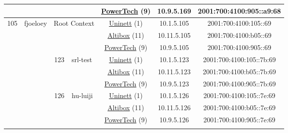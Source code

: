 \begin{small}
\begin{center}
\begin{longtable}{|c|c|c|c|c|c|c|c|}
  &  &  &  & \multicolumn{2}{|c|}{\tiny{\href{http://www.powertech.no}{PowerTech} (9)}} & \tiny{10.9.5.169} & \tiny{2001:700:4100:905::a9:68} \\ \hline
 \multirow{27}{*}{\tiny{105}} & \multicolumn{1}{|l|}{\multirow{27}{*}{\tiny{fjoeloey}}} & \multicolumn{2}{|c|}{\multirow{3}{*}{\tiny{Root Context}}} & \multicolumn{2}{|c|}{\tiny{\href{https://www.uninett.no}{Uninett} (1)}} & \tiny{10.1.5.105} & \tiny{2001:700:4100:105::69} \\* \cline{5-5}\cline{6-6}\cline{7-7}\cline{8-8}
  &  & \multicolumn{2}{|c|}{} & \multicolumn{2}{|c|}{\tiny{\href{https://www.altibox.no}{Altibox} (11)}} & \tiny{10.11.5.105} & \tiny{2001:700:4100:b05::69} \\* \cline{5-5}\cline{6-6}\cline{7-7}\cline{8-8}
  &  & \multicolumn{2}{|c|}{} & \multicolumn{2}{|c|}{\tiny{\href{http://www.powertech.no}{PowerTech} (9)}} & \tiny{10.9.5.105} & \tiny{2001:700:4100:905::69} \\* \cline{3-3}\cline{4-4}\cline{5-5}\cline{6-6}\cline{7-7}\cline{8-8}
  &  & \multirow{3}{*}{\tiny{123}} & \multicolumn{1}{|l|}{\multirow{3}{*}{\tiny{srl-test}}} & \multicolumn{2}{|c|}{\tiny{\href{https://www.uninett.no}{Uninett} (1)}} & \tiny{10.1.5.123} & \tiny{2001:700:4100:105::7b:69} \\* \cline{5-5}\cline{6-6}\cline{7-7}\cline{8-8}
  &  &  &  & \multicolumn{2}{|c|}{\tiny{\href{https://www.altibox.no}{Altibox} (11)}} & \tiny{10.11.5.123} & \tiny{2001:700:4100:b05::7b:69} \\* \cline{5-5}\cline{6-6}\cline{7-7}\cline{8-8}
  &  &  &  & \multicolumn{2}{|c|}{\tiny{\href{http://www.powertech.no}{PowerTech} (9)}} & \tiny{10.9.5.123} & \tiny{2001:700:4100:905::7b:69} \\* \cline{3-3}\cline{4-4}\cline{5-5}\cline{6-6}\cline{7-7}\cline{8-8}
  &  & \multirow{3}{*}{\tiny{126}} & \multicolumn{1}{|l|}{\multirow{3}{*}{\tiny{hu-luiji}}} & \multicolumn{2}{|c|}{\tiny{\href{https://www.uninett.no}{Uninett} (1)}} & \tiny{10.1.5.126} & \tiny{2001:700:4100:105::7e:69} \\* \cline{5-5}\cline{6-6}\cline{7-7}\cline{8-8}
  &  &  &  & \multicolumn{2}{|c|}{\tiny{\href{https://www.altibox.no}{Altibox} (11)}} & \tiny{10.11.5.126} & \tiny{2001:700:4100:b05::7e:69} \\* \cline{5-5}\cline{6-6}\cline{7-7}\cline{8-8}
  &  &  &  & \multicolumn{2}{|c|}{\tiny{\href{http://www.powertech.no}{PowerTech} (9)}} & \tiny{10.9.5.126} & \tiny{2001:700:4100:905::7e:69} \\* \cline{3-3}\cline{4-4}\cline{5-5}\cline{6-6}\cline{7-7}\cline{8-8}

\end{longtable}
\end{center}
\end{small}
